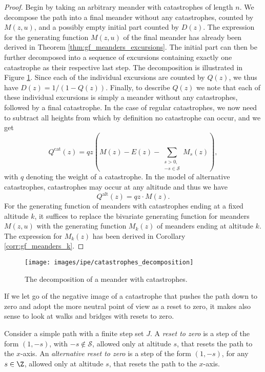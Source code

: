 \begin{proof}
  Begin by taking an arbitrary meander with catastrophes of length $n$.
  We decompose the path into a final meander without any catastrophes, counted by $M(z,u)$, and a possibly empty initial part counted by $D(z)$.
  The expression for the generating function $M(z,u)$ of the final meander has already been derived in Theorem \ref{thm:gf_meanders_excursions}.
  The initial part can then be further decomposed into a sequence of excursions containing exactly one catastrophe as their respective last step. The decomposition is illustrated in Figure \ref{fig:catastrophes_decomposition}.
  Since each of the individual excursions are counted by $Q(z)$, we thus have $D(z) = 1/(1 - Q(z))$.
  Finally, to describe $Q(z)$ we note that each of these individual excursions is simply a meander without any catastrophes, followed by a final catastrophe. 
  In the case of regular catastrophes, we now need to subtract all heights from which by definition no catastrophe can occur, and we get 
  $$
    Q^\mathrm{cat}(z) = q z \left(M(z) - E(z) - \sum_{\substack{s > 0, \\ -s\in \mathcal{S}}} M_s(z)\right),
  $$
  with $q$ denoting the weight of a catastrophe. In the model of alternative catastrophes, catastrophes may occur at any altitude and thus we have
  \begin{equation*}
    Q^{\mathrm{alt}}(z) = q z \cdot M(z).
  \end{equation*}
  For the generating function of meanders with catastrophes ending at a fixed altitude $k$, it suffices to replace the bivariate generating function for meanders $M(z,u)$ with the generating function $M_k(z)$ of meanders ending at altitude $k$. The expression for $M_k(z)$ has been derived in Corollary \ref{corr:gf_meanders_k}.
\end{proof}

\begin{figure}
  \centering
  \texttt{[image: images/ipe/catastrophes\_decomposition]}
  \caption{The decomposition of a meander with catastrophes.}
  \label{fig:catastrophes_decomposition}
\end{figure}

If we let go of the negative image of a catastrophe that pushes the path down to zero and adopt the more neutral point of view as a reset to zero, it makes also sense to look at walks and bridges with resets to zero. 

\begin{definition}
  Consider a simple path with a finite step set $J$. A \textit{reset to zero} is a step of the form $(1, -s)$, with $-s \notin \mathcal{S}$, allowed only at altitude $s$, that resets the path to the $x$-axis.
  An \textit{alternative reset to zero} is a step of the form $(1, -s)$, for any $s \in \Z$, allowed only at altitude $s$, that resets the path to the $x$-axis.
\end{definition}

